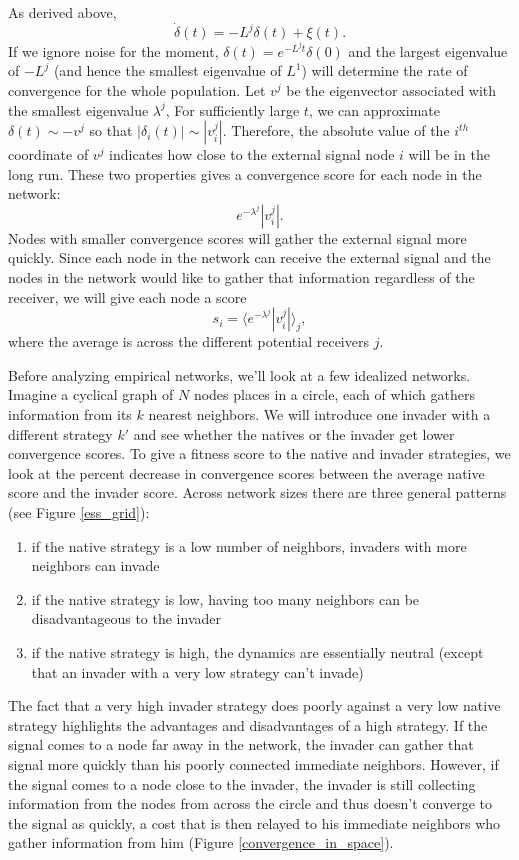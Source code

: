 \documentclass{article}
\begin{document}
As derived above,
$$\dot{\delta}(t)=-L^j\delta(t)+\xi(t).$$
If we ignore noise for the moment, $\delta(t)=e^{-L^jt}\delta(0)$ and the largest eigenvalue of $-L^j$ (and hence the smallest eigenvalue of $L^1$) will determine the rate of convergence for the whole population.   Let $v^j$ be the eigenvector associated with the smallest eigenvalue $\lambda^j$, For sufficiently large $t$, we can approximate $\delta(t)\sim -v^j$ so that $|\delta_i(t)|\sim |v_i^j|$.  Therefore, the absolute value of the $i^{th}$ coordinate of $v^j$ indicates how close to the external signal node $i$ will be in the long run.  These two properties gives a convergence score for each node in the network:
$$e^{-\lambda^j}|v_i^j|.$$
Nodes with smaller convergence scores will gather the external signal more quickly.  Since each node in the network can receive the external signal and the nodes in the network would like to gather that information regardless of the receiver, we will give each node a score 
$$s_i=\langle e^{-\lambda^j}|v_i^j| \rangle_j,$$
where the average is across the different potential receivers $j$.

Before analyzing empirical networks, we'll look at a few idealized networks.  Imagine a cyclical graph of $N$ nodes places in a circle, each of which gathers information from its $k$ nearest neighbors.  We will introduce one invader with a different strategy $k'$ and see whether the natives or the invader get lower convergence scores.  To give a fitness score to the native and invader strategies, we look at the percent decrease in convergence scores between the average native score and the invader score.  Across network sizes there are three general patterns (see Figure \ref{ess_grid}):
\begin{enumerate}
\item if the native strategy is a low number of neighbors, invaders with more neighbors can invade
\item if the native strategy is low, having too many neighbors can be disadvantageous to the invader
\item if the native strategy is high, the dynamics are essentially neutral (except that an invader with a very low strategy can't invade)
\end{enumerate}

The fact that a very high invader strategy does poorly against a very low native strategy highlights the advantages and disadvantages of a high strategy.  If the signal comes to a node far away in the network, the invader can gather that signal more quickly than his poorly connected immediate neighbors.  However, if the signal comes to a node close to the invader, the invader is still collecting information from the nodes from across the circle and thus doesn't converge to the signal as quickly, a cost that is then relayed to his immediate neighbors who gather information from him (Figure \ref{convergence_in_space}).
\end{document}
